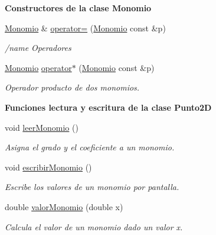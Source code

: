 \begin{Indent}{\bf Constructores de la clase Monomio}
\begin{DoxyCompactItemize}
\hyperlink{classed_1_1Monomio}{Monomio} \& \hyperlink{classed_1_1Monomio_a45103846ab828a1d4ff54cd723e14658}{operator=} (\hyperlink{classed_1_1Monomio}{Monomio} const \&p)
\begin{DoxyCompactList}\small\item\em /name Operadores \end{DoxyCompactList}\item 
\hyperlink{classed_1_1Monomio}{Monomio} \hyperlink{classed_1_1Monomio_a91a18ac215d83c32ab2803963441f79d}{operator$\ast$} (\hyperlink{classed_1_1Monomio}{Monomio} const \&p)
\begin{DoxyCompactList}\small\item\em Operador producto de dos monomios. \end{DoxyCompactList}\end{DoxyCompactItemize}
\end{Indent}
\begin{Indent}{\bf Funciones lectura y escritura de la clase Punto2\-D}\par
\begin{DoxyCompactItemize}
\item 
void \hyperlink{classed_1_1Monomio_a1d3ec4190c5e23d93eff79ad8e9486c0}{leer\-Monomio} ()
\begin{DoxyCompactList}\small\item\em Asigna el grado y el coeficiente a un monomio. \end{DoxyCompactList}\item 
void \hyperlink{classed_1_1Monomio_a42484a47d0d877232ee7775b97b1d480}{escribir\-Monomio} ()
\begin{DoxyCompactList}\small\item\em Escribe los valores de un monomio por pantalla. \end{DoxyCompactList}\item 
double \hyperlink{classed_1_1Monomio_a1fef28505a36f4ef961d47ab16281238}{valor\-Monomio} (double x)
\begin{DoxyCompactList}\small\item\em Calcula el valor de un monomio dado un valor x. \end{DoxyCompactList}\end{DoxyCompactItemize}
\end{Indent}
